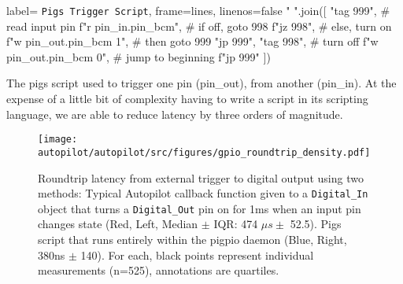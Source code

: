 \begin{marginfigure}[0cm]
\begin{pythoncode*}{
label= \texttt{Pigs Trigger Script},
frame=lines,
linenos=false}
" ".join([
  "tag 999",
  # read input pin
  f"r {pin_in.pin_bcm}",
  # if off, goto 998
  f"jz 998", 
  # else, turn on
  f"w {pin_out.pin_bcm} 1",
  # then goto 999
  "jp 999", 
  "tag 998",
  # turn off
  f"w {pin_out.pin_bcm} 0",
  # jump to beginning
  f"jp 999"
])
\end{pythoncode*}
\caption{The pigs script used to trigger one pin (pin\_out), from another (pin\_in). At the expense of a little bit of complexity having to write a script in its scripting language, we are able to reduce latency by three orders of magnitude.}
\label{fig:pigsscript}
\end{marginfigure}


\begin{figure}[hb!]
\caption{Roundtrip latency from external trigger to digital output using two methods: Typical Autopilot callback function given to a \texttt{Digital\_In} object that turns a \texttt{Digital\_Out} pin on for 1ms when an input pin changes state (Red, Left, Median $\pm$ IQR: 474 $\mu s \pm$ 52.5). Pigs script that runs entirely within the pigpio daemon (Blue, Right, 380ns $\pm$ 140). For each, black points represent individual measurements (n=525), annotations are quartiles.}
\label{fig:gpiort}
\texttt{[image: autopilot/autopilot/src/figures/gpio\_roundtrip\_density.pdf]}
\end{figure}

\clearpage


